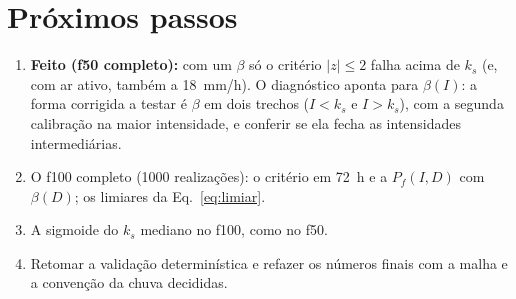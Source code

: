 \documentclass[11pt,a4paper]{article}
\newcommand{\Pf}{P_f}
\begin{document}
\section{Próximos passos}
\begin{enumerate}
  \item \textbf{Feito (f50 completo):} com um $\beta$ só o critério $|z| \le 2$ falha acima de $k_s$ (e, com ar ativo,
    também a 18~mm/h). O diagnóstico aponta para $\beta(I)$: a forma corrigida a testar é $\beta$ em dois trechos
    ($I < k_s$ e $I > k_s$), com a segunda calibração na maior intensidade, e conferir se ela fecha as intensidades
    intermediárias.
  \item O f100 completo (1000 realizações): o critério em 72~h e a $\Pf(I, D)$ com $\beta(D)$; os limiares da
    Eq.~\ref{eq:limiar}.
  \item A sigmoide do $k_s$ mediano no f100, como no f50.
  \item Retomar a validação determinística e refazer os números finais com a malha e a convenção da chuva decididas.
\end{enumerate}
\end{document}
